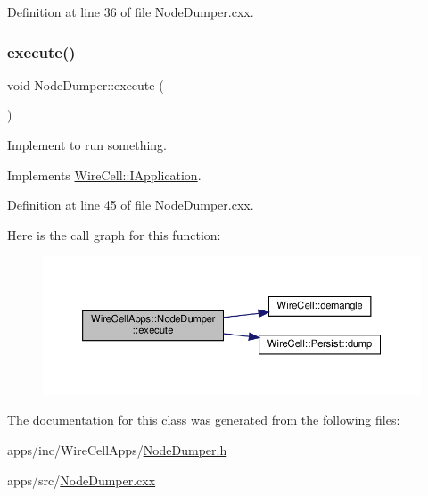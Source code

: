 Definition at line 36 of file Node\+Dumper.\+cxx.

\mbox{\label{class_wire_cell_apps_1_1_node_dumper_a43d628cfd19e738b3bb2037ac901fd4b}} 
\subsubsection{\texorpdfstring{execute()}{execute()}}
{\footnotesize\ttfamily void Node\+Dumper\+::execute (\begin{DoxyParamCaption}{ }\end{DoxyParamCaption})\hspace{0.3cm}{\ttfamily [virtual]}}



Implement to run something. 



Implements \hyperlink{class_wire_cell_1_1_i_application_a5c77275a37093541aaad6410d8ce5c31}{Wire\+Cell\+::\+I\+Application}.



Definition at line 45 of file Node\+Dumper.\+cxx.

Here is the call graph for this function\+:
\nopagebreak
\begin{figure}[H]
\begin{center}
\leavevmode
\includegraphics[width=350pt]{class_wire_cell_apps_1_1_node_dumper_a43d628cfd19e738b3bb2037ac901fd4b_cgraph}
\end{center}
\end{figure}


The documentation for this class was generated from the following files\+:\begin{DoxyCompactItemize}
\item 
apps/inc/\+Wire\+Cell\+Apps/\hyperlink{_node_dumper_8h}{Node\+Dumper.\+h}\item 
apps/src/\hyperlink{_node_dumper_8cxx}{Node\+Dumper.\+cxx}\end{DoxyCompactItemize}
